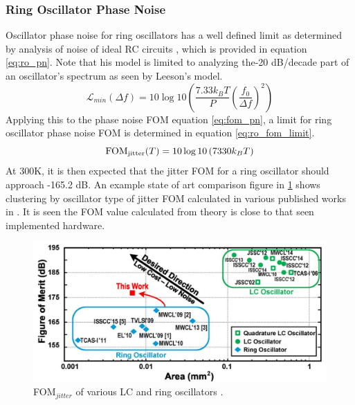 	\subsubsection{Ring Oscillator Phase Noise}
	Oscillator phase noise for ring oscillators has a well defined limit as determined by analysis of noise of ideal RC circuits \cite{Navid2005}, which is provided in equation \ref{eq:ro_pn}. Note that his model is limited to analyzing the-20 dB/decade part of an oscillator's spectrum as seen by Leeson's model.
	\begin{equation}\label{eq:ro_pn}
		\mathcal{L}_{min}(\Delta f)= 10\log 10\left(\frac{7.33k_BT}{P}\left(\frac{f_0}{\Delta f}\right)^2\right)
	\end{equation}
	Applying this to the phase noise FOM equation \ref{eq:fom_pn}, a limit for ring oscillator phase noise FOM is determined in equation \ref{eq:ro_fom_limit}.
	\begin{equation}\label{eq:ro_fom_limit}
		\textnormal{FOM}_{\textnormal{jitter}}(T) = 10\log 10\left(7330k_BT\right)
	\end{equation}
	At 300K, it is then expected that the jitter FOM for a ring oscillator should approach -165.2 dB. An example state of art comparison figure in \ref{fig:lc_ro_fom} shows clustering by oscillator type of jitter FOM calculated in various published works in \cite{Tohidian2015}. It is seen the FOM value calculated from theory is close to that seen implemented hardware.
	\begin{figure}[htb!]
		\center\includegraphics[width=1\textwidth, angle=0]{./figs/lc_ro_fom_comparison}
		\caption{FOM$_{jitter}$ of various LC and ring oscillators \cite{Tohidian2015}.}
		\label{fig:lc_ro_fom}
	\end{figure}

	\FloatBarrier



